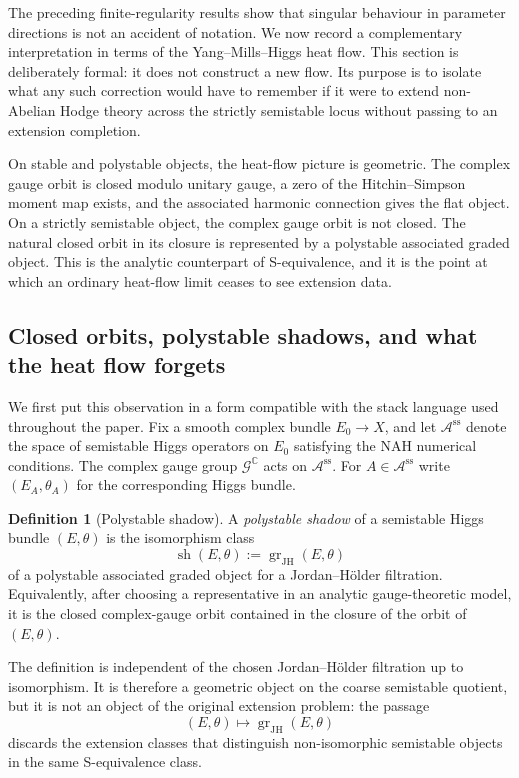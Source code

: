 \documentclass[11pt,reqno]{amsart}
\theoremstyle{definition}
\newtheorem{definition}[theorem]{Definition}
\theoremstyle{remark}
\newcommand{\C}{\mathbb C}
\newcommand{\cA}{\mathcal A}
\newcommand{\ssm}{\mathrm{ss}}
\newcommand{\Ggauge}{\mathscr G}
\begin{document}
The preceding finite-regularity results show that singular behaviour in parameter directions is not an accident of notation.  We now record a complementary interpretation in terms of the Yang--Mills--Higgs heat flow.  This section is deliberately formal: it does not construct a new flow.  Its purpose is to isolate what any such correction would have to remember if it were to extend non-Abelian Hodge theory across the strictly semistable locus without passing to an extension completion.

On stable and polystable objects, the heat-flow picture is geometric.  The complex gauge orbit is closed modulo unitary gauge, a zero of the Hitchin--Simpson moment map exists, and the associated harmonic connection gives the flat object.  On a strictly semistable object, the complex gauge orbit is not closed.  The natural closed orbit in its closure is represented by a polystable associated graded object.  This is the analytic counterpart of S-equivalence, and it is the point at which an ordinary heat-flow limit ceases to see extension data.

\subsection{Closed orbits, polystable shadows, and what the heat flow forgets}

We first put this observation in a form compatible with the stack language used throughout the paper.  Fix a smooth complex bundle $E_0\to X$, and let $\cA^{\ssm}$ denote the space of semistable Higgs operators on $E_0$ satisfying the NAH numerical conditions.  The complex gauge group $\Ggauge^{\C}$ acts on $\cA^{\ssm}$.  For $A\in\cA^{\ssm}$ write $(E_A,\theta_A)$ for the corresponding Higgs bundle.

\begin{definition}[Polystable shadow]\label{def:polystable-shadow}
A \emph{polystable shadow} of a semistable Higgs bundle $(E,\theta)$ is the isomorphism class
\[
  \operatorname{sh}(E,\theta):=\operatorname{gr}_{\mathrm{JH}}(E,\theta)
\]
of a polystable associated graded object for a Jordan--H\"older filtration.  Equivalently, after choosing a representative in an analytic gauge-theoretic model, it is the closed complex-gauge orbit contained in the closure of the orbit of $(E,\theta)$.
\end{definition}

The definition is independent of the chosen Jordan--H\"older filtration up to isomorphism.  It is therefore a geometric object on the coarse semistable quotient, but it is not an object of the original extension problem: the passage
\[
  (E,\theta)\longmapsto \operatorname{gr}_{\mathrm{JH}}(E,\theta)
\]
discards the extension classes that distinguish non-isomorphic semistable objects in the same S-equivalence class.
\end{document}
